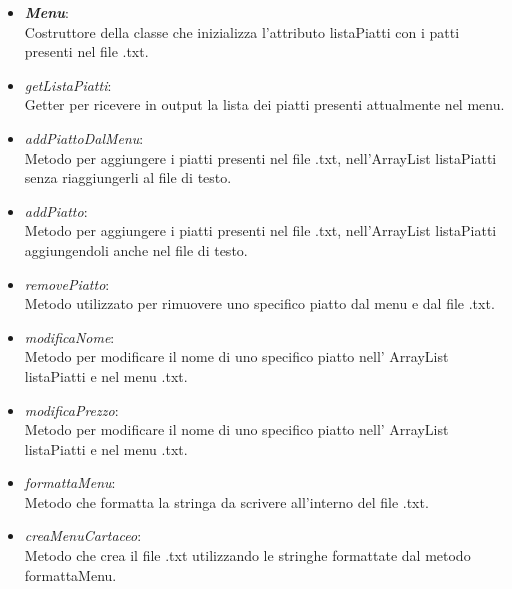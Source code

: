 \documentclass{article}
\begin{document}
\begin{itemize}
\begin{itemize}
            \begin{itemize}
                \item \textbf{\textit{Menu}}:\\Costruttore della classe che inizializza l'attributo listaPiatti con i patti presenti nel file .txt.\\
                \item \textit{getListaPiatti}:\\Getter per ricevere in output la lista dei piatti presenti attualmente nel menu.\\
                \item \textit{addPiattoDalMenu}: \\Metodo per aggiungere i piatti presenti nel file .txt, nell'ArrayList listaPiatti senza riaggiungerli al file di testo.\\
                \item \textit{addPiatto}: \\Metodo per aggiungere i piatti presenti nel file .txt, nell'ArrayList listaPiatti aggiungendoli anche nel file di testo.\\
                \item \textit{removePiatto}: \\Metodo utilizzato per rimuovere uno specifico piatto dal menu e dal file .txt.\\
                \item \textit{modificaNome}: \\Metodo per modificare il nome di uno specifico piatto nell' ArrayList listaPiatti e nel menu .txt.\\
                \item \textit{modificaPrezzo}: \\Metodo per modificare il nome di uno specifico piatto nell' ArrayList listaPiatti e nel menu .txt.\\
                \item \textit{formattaMenu}: \\Metodo che formatta la stringa da scrivere all'interno del file .txt.\\
                \item \textit{creaMenuCartaceo}: \\Metodo che crea il file .txt utilizzando le stringhe formattate dal metodo formattaMenu.\\
            \end{itemize}
            
        \end{itemize}
        

\end{itemize}
\end{document}
